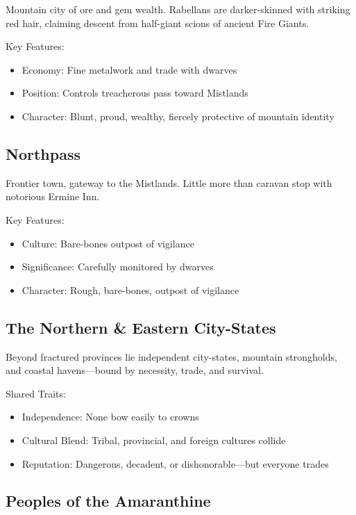 Mountain city of ore and gem wealth. Rabellans are darker-skinned with striking red hair, claiming descent from half-giant scions of ancient Fire Giants.

Key Features:
\begin{itemize}
    \item Economy: Fine metalwork and trade with dwarves
    \item Position: Controls treacherous pass toward Mistlands
    \item Character: Blunt, proud, wealthy, fiercely protective of mountain identity
\end{itemize}

\subsection{Northpass}
\label{sec:northpass}

Frontier town, gateway to the Mistlands. Little more than caravan stop with notorious Ermine Inn.

Key Features:
\begin{itemize}
    \item Culture: Bare-bones outpost of vigilance
    \item Significance: Carefully monitored by dwarves
    \item Character: Rough, bare-bones, outpost of vigilance
\end{itemize}

\subsection{The Northern \& Eastern City-States}
\label{sec:citystates}

Beyond fractured provinces lie independent city-states, mountain strongholds, and coastal havens—bound by necessity, trade, and survival.

Shared Traits:
\begin{itemize}
    \item Independence: None bow easily to crowns
    \item Cultural Blend: Tribal, provincial, and foreign cultures collide
    \item Reputation: Dangerous, decadent, or dishonorable—but everyone trades
\end{itemize}

\subsection{Peoples of the Amaranthine}

